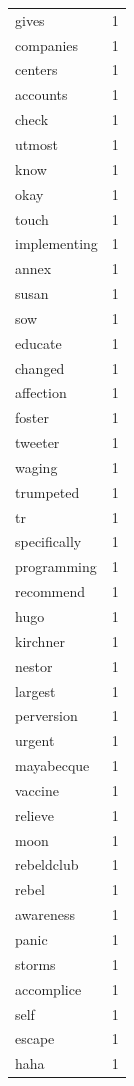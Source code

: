 \begin{tabular}{lr}
gives & 1 \\
companies & 1 \\
centers & 1 \\
accounts & 1 \\
check & 1 \\
utmost & 1 \\
know & 1 \\
okay & 1 \\
touch & 1 \\
implementing & 1 \\
annex & 1 \\
susan & 1 \\
sow & 1 \\
educate & 1 \\
changed & 1 \\
affection & 1 \\
foster & 1 \\
tweeter & 1 \\
waging & 1 \\
trumpeted & 1 \\
tr & 1 \\
specifically & 1 \\
programming & 1 \\
recommend & 1 \\
hugo & 1 \\
kirchner & 1 \\
nestor & 1 \\
largest & 1 \\
perversion & 1 \\
urgent & 1 \\
mayabecque & 1 \\
vaccine & 1 \\
relieve & 1 \\
moon & 1 \\
rebeldclub & 1 \\
rebel & 1 \\
awareness & 1 \\
panic & 1 \\
storms & 1 \\
accomplice & 1 \\
self & 1 \\
escape & 1 \\
haha & 1 \\
\bottomrule
\end{tabular}
